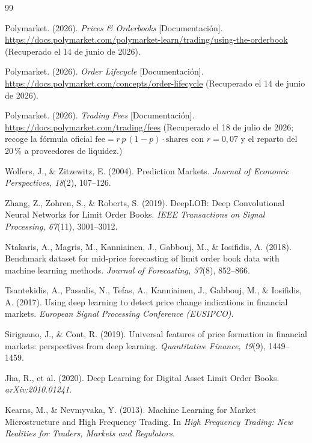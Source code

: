 \begin{thebibliography}{99}

Polymarket. (2026). \textit{Prices \& Orderbooks} [Documentación].
\url{https://docs.polymarket.com/polymarket-learn/trading/using-the-orderbook}
(Recuperado el 14 de junio de 2026).

Polymarket. (2026). \textit{Order Lifecycle} [Documentación].
\url{https://docs.polymarket.com/concepts/order-lifecycle}
(Recuperado el 14 de junio de 2026).

Polymarket. (2026). \textit{Trading Fees} [Documentación].
\url{https://docs.polymarket.com/trading/fees}
(Recuperado el 18 de julio de 2026; recoge la fórmula oficial
$\mathrm{fee} = r\,p\,(1-p)\cdot\mathrm{shares}$ con $r=0{,}07$ y el reparto del 20\,\%
a proveedores de liquidez.)

Wolfers, J., \& Zitzewitz, E. (2004). Prediction Markets.
\textit{Journal of Economic Perspectives, 18}(2), 107--126.

Zhang, Z., Zohren, S., \& Roberts, S. (2019). DeepLOB: Deep Convolutional Neural
Networks for Limit Order Books. \textit{IEEE Transactions on Signal Processing,
67}(11), 3001--3012.

Ntakaris, A., Magris, M., Kanniainen, J., Gabbouj, M., \& Iosifidis, A. (2018).
Benchmark dataset for mid-price forecasting of limit order book data with machine
learning methods. \textit{Journal of Forecasting, 37}(8), 852--866.

Tsantekidis, A., Passalis, N., Tefas, A., Kanniainen, J., Gabbouj, M., \& Iosifidis, A.
(2017). Using deep learning to detect price change indications in financial markets.
\textit{European Signal Processing Conference (EUSIPCO)}.

Sirignano, J., \& Cont, R. (2019). Universal features of price formation in financial
markets: perspectives from deep learning. \textit{Quantitative Finance, 19}(9), 1449--1459.

Jha, R., et al. (2020). Deep Learning for Digital Asset Limit Order Books.
\textit{arXiv:2010.01241}.

Kearns, M., \& Nevmyvaka, Y. (2013). Machine Learning for Market Microstructure and
High Frequency Trading. In \textit{High Frequency Trading: New Realities for Traders,
Markets and Regulators}.


\end{thebibliography}
